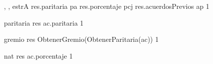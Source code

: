 {, , }{estrA}
{
	\state res.paritaria \asig pa								
	\state res.porcentaje \asig pcj								
	\state res.acuerdosPrevios \asig ap							
}
{1}
{}

{}{paritaria}
{
	\state res \asig ac.paritaria 								
}
{1}
{}

{}{gremio}
{
	\state res \asig ObtenerGremio(ObtenerParitaria(ac)) 		
}
{1}
{}

{}{nat}
{
	\state res \asig ac.porcentaje		
}
{1}
{}